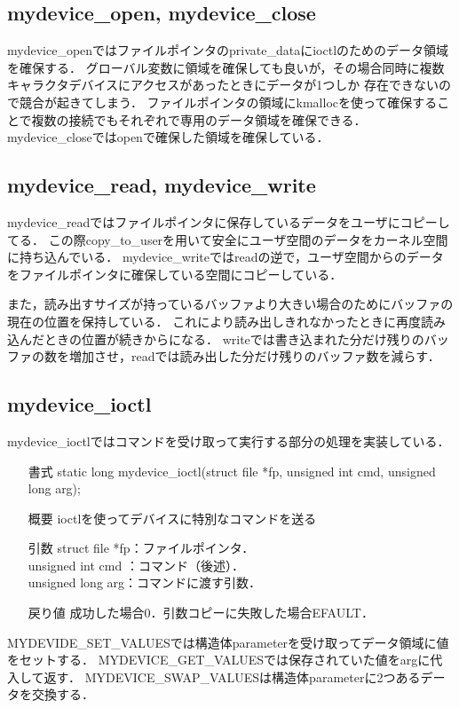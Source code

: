 \subsection{mydevice\_open, mydevice\_close}
mydevice\_openではファイルポインタのprivate\_dataにioctlのためのデータ領域を確保する．
グローバル変数に領域を確保しても良いが，その場合同時に複数キャラクタデバイスにアクセスがあったときにデータが1つしか
存在できないので競合が起きてしまう．
ファイルポインタの領域にkmallocを使って確保することで複数の接続でもそれぞれで専用のデータ領域を確保できる．
mydevice\_closeではopenで確保した領域を確保している．

\subsection{mydevice\_read, mydevice\_write}
mydevice\_readではファイルポインタに保存しているデータをユーザにコピーしてる．
この際copy\_to\_userを用いて安全にユーザ空間のデータをカーネル空間に持ち込んでいる．
mydevice\_writeではreadの逆で，ユーザ空間からのデータをファイルポインタに確保している空間にコピーしている．

また，読み出すサイズが持っているバッファより大きい場合のためにバッファの現在の位置を保持している．
これにより読み出しきれなかったときに再度読み込んだときの位置が続きからになる．
writeでは書き込まれた分だけ残りのバッファの数を増加させ，readでは読み出した分だけ残りのバッファ数を減らす．

\subsection{mydevice\_ioctl}
mydevice\_ioctlではコマンドを受け取って実行する部分の処理を実装している．
\begin{itemize}
    \item[書式] static long mydevice\_ioctl(struct file *fp, unsigned int cmd, unsigned long arg);
    \item[概要] ioctlを使ってデバイスに特別なコマンドを送る
    \item[引数] struct file *fp：ファイルポインタ．\\
                unsigned int cmd ：コマンド（後述）．\\
                unsigned long arg：コマンドに渡す引数．
    \item[戻り値] 成功した場合0．引数コピーに失敗した場合EFAULT．
\end{itemize}
MYDEVIDE\_SET\_VALUESでは構造体parameterを受け取ってデータ領域に値をセットする．
MYDEVICE\_GET\_VALUESでは保存されていた値をargに代入して返す．
MYDEVICE\_SWAP\_VALUESは構造体parameterに2つあるデータを交換する．

